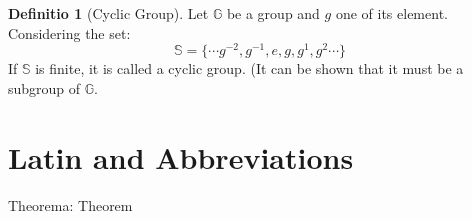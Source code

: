 \documentclass[12pt, a4paper]{report}
\theoremstyle{definition}
\newtheorem{definition}{Definitio}[section]
\theoremstyle{definition}
\theoremstyle{remark}
\begin{document}
\begin{definition}[Cyclic Group]
Let $\mathbb{G}$ be a group and $g$ one of its element. Considering the set:
\[
	\mathbb{S} = \{\cdots g^{-2}, g^{-1}, e, g, g^1, g^2 \cdots\}  
\]
If $\mathbb{S}$ is finite, it is called a cyclic group. (It can be shown that it must be a subgroup of $\mathbb{G}$.
\end{definition}

\appendix
\renewcommand{\thechapter}{\Roman{chapter}}
\chapter{Latin and Abbreviations}
\begin{multicols}{2} %
Theorema: Theorem
\end{multicols}
\end{document}
